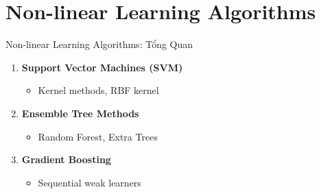 
\section{Non-linear Learning Algorithms}

\begin{frame}{Non-linear Learning Algorithms: Tổng Quan}
            \begin{enumerate}
                \item \textbf{Support Vector Machines (SVM)}
                \begin{itemize}
                    \item Kernel methods, RBF kernel
                \end{itemize}
                
                \item \textbf{Ensemble Tree Methods}
                \begin{itemize}
                    \item Random Forest, Extra Trees
                \end{itemize}
                
                \item \textbf{Gradient Boosting}
                \begin{itemize}
                    \item Sequential weak learners
                \end{itemize}
            \end{enumerate}

\end{frame}

